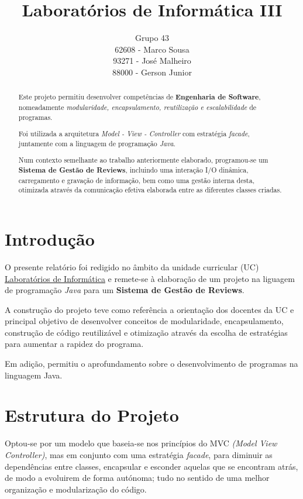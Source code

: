 \documentclass[11pt]{article}
\title{Laboratórios de Informática III}
\author{Grupo 43 \\ 62608 - Marco Sousa \\ 93271 - José Malheiro \\ 88000 - Gerson Junior}
\begin{document}
\maketitle

\begin{abstract}
	Este projeto permitiu desenvolver competências de \textbf{Engenharia de Software}, nomeadamente \textit{modularidade, encapsulamento, reutilização e escalabilidade} de programas.
	
	Foi utilizada a arquitetura \textit{Model - View - Controller} com estratégia \textit{facade}, juntamente com a linguagem de programação \textit{Java}.
	
	Num contexto semelhante ao trabalho anteriormente elaborado, programou-se um \textbf{Sistema de Gestão de Reviews}, incluindo uma interação I/O dinâmica, carregamento e gravação de informação, bem como uma gestão interna desta, otimizada através da comunicação efetiva elaborada entre as diferentes classes criadas.
\end{abstract}

\section{Introdução}

O presente relatório foi redigido no âmbito da unidade curricular (UC) \underline{Laboratórios de Informática} e remete-se à elaboração de um projeto na liguagem de programação \textit{Java} para um \textbf{Sistema de Gestão de Reviews}.

A construção do projeto teve como referência a orientação dos docentes da UC e principal objetivo de desenvolver
conceitos de modularidade, encapsulamento, construção de código reutilizável e otimização através da escolha de estratégias para aumentar a rapidez do programa.

Em adição, permitiu o aprofundamento sobre o desenvolvimento de programas na linguagem Java.

\section{Estrutura do Projeto}

Optou-se por um modelo que baseia-se nos princípios do MVC \textit{(Model View Controller)}, mas em conjunto com uma estratégia \textit{facade}, 
para diminuir as dependências entre classes, encapsular e esconder aquelas que se encontram atrás, de modo a evoluirem de forma autónoma;
tudo no sentido de uma melhor organização e modularização do código.
\end{document}

